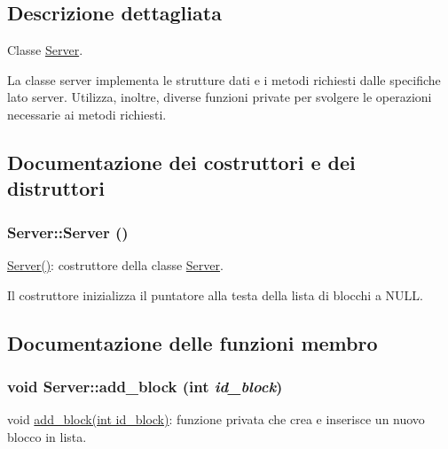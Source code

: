 \subsection{Descrizione dettagliata}
Classe \hyperlink{classServer}{Server}. 

La classe server implementa le strutture dati e i metodi richiesti dalle specifiche lato server. Utilizza, inoltre, diverse funzioni private per svolgere le operazioni necessarie ai metodi richiesti. 

\subsection{Documentazione dei costruttori e dei distruttori}
\hypertarget{classServer_d5ec9462b520e59f7ea831e157ee5e59_d5ec9462b520e59f7ea831e157ee5e59}{
\subsubsection[{Server}]{\setlength{\rightskip}{0pt plus 5cm}Server::Server ()}}
\label{classServer_d5ec9462b520e59f7ea831e157ee5e59_d5ec9462b520e59f7ea831e157ee5e59}


\hyperlink{classServer_d5ec9462b520e59f7ea831e157ee5e59_d5ec9462b520e59f7ea831e157ee5e59}{Server()}: costruttore della classe \hyperlink{classServer}{Server}. 

Il costruttore inizializza il puntatore alla testa della lista di blocchi a NULL. 

\subsection{Documentazione delle funzioni membro}
\hypertarget{classServer_5080669f010965f6b2594d13c4e2f70d_5080669f010965f6b2594d13c4e2f70d}{
\subsubsection[{add\_\-block}]{\setlength{\rightskip}{0pt plus 5cm}void Server::add\_\-block (int {\em id\_\-block})}}
\label{classServer_5080669f010965f6b2594d13c4e2f70d_5080669f010965f6b2594d13c4e2f70d}


void \hyperlink{classServer_5080669f010965f6b2594d13c4e2f70d_5080669f010965f6b2594d13c4e2f70d}{add\_\-block(int id\_\-block)}: funzione privata che crea e inserisce un nuovo blocco in lista. 

